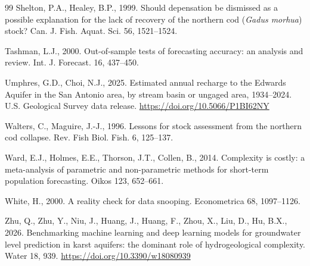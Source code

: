 \documentclass[preprint,11pt,authoryear]{elsarticle}
\theoremstyle{definition}
\theoremstyle{remark}
\begin{document}
\begin{thebibliography}{99}
Shelton, P.A., Healey, B.P., 1999. Should depensation be dismissed as a possible explanation for the lack of recovery of the northern cod (\emph{Gadus morhua}) stock? Can. J. Fish. Aquat. Sci. 56, 1521--1524.

Tashman, L.J., 2000. Out-of-sample tests of forecasting accuracy: an analysis and review. Int. J. Forecast. 16, 437--450.

Umphres, G.D., Choi, N.J., 2025. Estimated annual recharge to the Edwards Aquifer in the San Antonio area, by stream basin or ungaged area, 1934--2024. U.S. Geological Survey data release. \url{https://doi.org/10.5066/P1BI62NY}

Walters, C., Maguire, J.-J., 1996. Lessons for stock assessment from the northern cod collapse. Rev. Fish Biol. Fish. 6, 125--137.

Ward, E.J., Holmes, E.E., Thorson, J.T., Collen, B., 2014. Complexity is costly: a meta-analysis of parametric and non-parametric methods for short-term population forecasting. Oikos 123, 652--661.

White, H., 2000. A reality check for data snooping. Econometrica 68, 1097--1126.

Zhu, Q., Zhu, Y., Niu, J., Huang, J., Huang, F., Zhou, X., Liu, D., Hu, B.X., 2026. Benchmarking machine learning and deep learning models for groundwater level prediction in karst aquifers: the dominant role of hydrogeological complexity. Water 18, 939. \url{https://doi.org/10.3390/w18080939}

\end{thebibliography}
\end{document}
